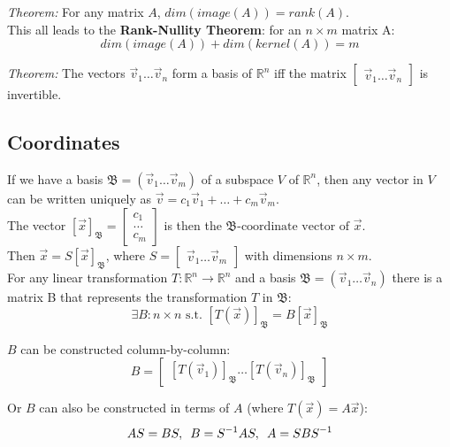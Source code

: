\documentclass[]{scrartcl}
\begin{document}
	\textit{Theorem:} For any matrix $A$, $dim(image(A)) = rank(A)$.\\
	
	This all leads to the \textbf{Rank-Nullity Theorem}: for an $n \times m$ matrix A:
	$$dim(image(A)) + dim(kernel(A)) = m$$
	
	\textit{Theorem:} The vectors $\vec{v}_1 \ldots \vec{v}_n$ form a basis of $\mathbb{R}^n$ iff the matrix $\begin{bmatrix} \vec{v}_1 \ldots \vec{v}_n \end{bmatrix}$ is invertible.
	
	\subsection{Coordinates}
	If we have a basis $\mathfrak{B} = (\vec{v}_1 \ldots \vec{v}_m)$ of a subspace $V$ of $\mathbb{R}^n$, then any vector in $V$ can be written uniquely as $\vec{v} = c_1\vec{v}_1+ \ldots +c_m\vec{v}_m$.\\
	
	The vector $[\vec{x}]_{\mathfrak{B}} = \begin{bmatrix}
		c_1 \\
		\ldots \\
		c_m
	\end{bmatrix}$ is then the $\mathfrak{B} \text{-coordinate vector of } \vec{x}$.\\
	
	Then $\vec{x} = S[\vec{x}]_{\mathfrak{B}}$, where $S = \begin{bmatrix} \vec{v}_1 \ldots \vec{v}_m \end{bmatrix}$ with dimensions $n \times m$.\\
	
	For any linear transformation $T: \mathbb{R}^n \rightarrow \mathbb{R}^n$ and a basis $\mathfrak{B} = (\vec{v}_1 \ldots \vec{v}_n)$ there is a matrix B that represents the transformation $T$ in $\mathfrak{B}$:
	$$
	\exists B: n \times n \text{ s.t. } [T(\vec{x})]_{\mathfrak{B}} = B[\vec{x}]_{\mathfrak{B}}
	$$
	
	$B$ can be constructed column-by-column:
	$$
	B = \begin{bmatrix}
	[T(\vec{v}_1)]_{\mathfrak{B}} \ldots [T(\vec{v}_n)]_{\mathfrak{B}}
	\end{bmatrix}
	$$
	
	Or $B$ can also be constructed in terms of $A$ (where $T(\vec{x}) = A\vec{x}$):
	$$
	AS=BS, \enskip B=S^{-1}AS, \enskip A=SBS^{-1}
	$$
	
\end{document}
